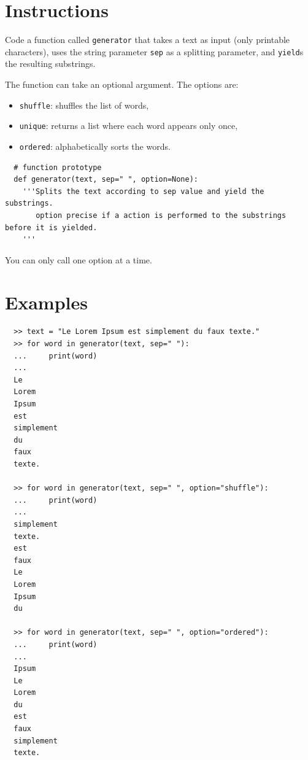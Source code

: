 \documentclass{42-en}
\begin{document}
\section*{Instructions}
Code a function called \texttt{generator} that takes a text as input (only printable characters), uses the string
parameter \texttt{sep} as a splitting parameter, and \texttt{yield}s the resulting substrings.

The function can take an optional argument.
The options are:
\begin{itemize}
  \item \texttt{shuffle}: shuffles the list of words,
  \item \texttt{unique}: returns a list where each word appears only once,
  \item \texttt{ordered}: alphabetically sorts the words.
\end{itemize}

\begin{verbatim}
  # function prototype
  def generator(text, sep=" ", option=None):
    '''Splits the text according to sep value and yield the substrings.
       option precise if a action is performed to the substrings before it is yielded.
    '''
\end{verbatim}

You can only call one option at a time.

\section*{Examples}
\begin{verbatim}
  >> text = "Le Lorem Ipsum est simplement du faux texte."
  >> for word in generator(text, sep=" "):
  ...     print(word)
  ...
  Le
  Lorem
  Ipsum
  est
  simplement
  du
  faux
  texte.

  >> for word in generator(text, sep=" ", option="shuffle"):
  ...     print(word)
  ...
  simplement
  texte.
  est
  faux
  Le
  Lorem
  Ipsum
  du

  >> for word in generator(text, sep=" ", option="ordered"):
  ...     print(word)
  ...
  Ipsum
  Le
  Lorem
  du
  est
  faux
  simplement
  texte.
\end{verbatim}
\end{document}
